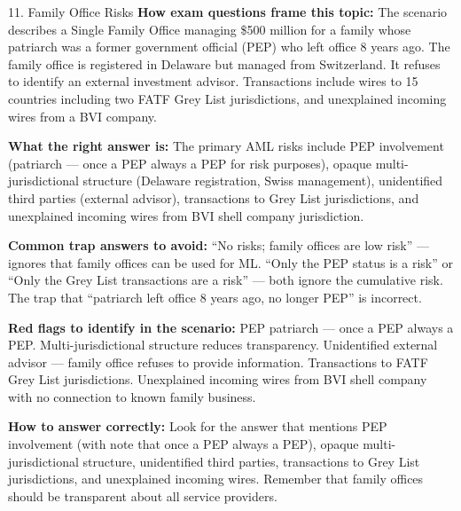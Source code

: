\documentclass[11pt,a4paper]{beamer}
\begin{document}
	\begin{frame}{11. Family Office Risks}
		\tiny
		\noindent\textbf{How exam questions frame this topic:} The scenario describes a Single Family Office managing \$500 million for a family whose patriarch was a former government official (PEP) who left office 8 years ago. The family office is registered in Delaware but managed from Switzerland. It refuses to identify an external investment advisor. Transactions include wires to 15 countries including two FATF Grey List jurisdictions, and unexplained incoming wires from a BVI company.
		
		\vspace{0.1cm}
		\noindent\textbf{What the right answer is:} The primary AML risks include PEP involvement (patriarch — once a PEP always a PEP for risk purposes), opaque multi-jurisdictional structure (Delaware registration, Swiss management), unidentified third parties (external advisor), transactions to Grey List jurisdictions, and unexplained incoming wires from BVI shell company jurisdiction.
		
		\vspace{0.1cm}
		\noindent\textbf{Common trap answers to avoid:} “No risks; family offices are low risk” — ignores that family offices can be used for ML. “Only the PEP status is a risk” or “Only the Grey List transactions are a risk” — both ignore the cumulative risk. The trap that “patriarch left office 8 years ago, no longer PEP” is incorrect.
		
		\vspace{0.1cm}
		\noindent\textbf{Red flags to identify in the scenario:} PEP patriarch — once a PEP always a PEP. Multi-jurisdictional structure reduces transparency. Unidentified external advisor — family office refuses to provide information. Transactions to FATF Grey List jurisdictions. Unexplained incoming wires from BVI shell company with no connection to known family business.
		
		\vspace{0.1cm}
		\noindent\textbf{How to answer correctly:} Look for the answer that mentions PEP involvement (with note that once a PEP always a PEP), opaque multi-jurisdictional structure, unidentified third parties, transactions to Grey List jurisdictions, and unexplained incoming wires. Remember that family offices should be transparent about all service providers.
	\end{frame}
	
\end{document}
